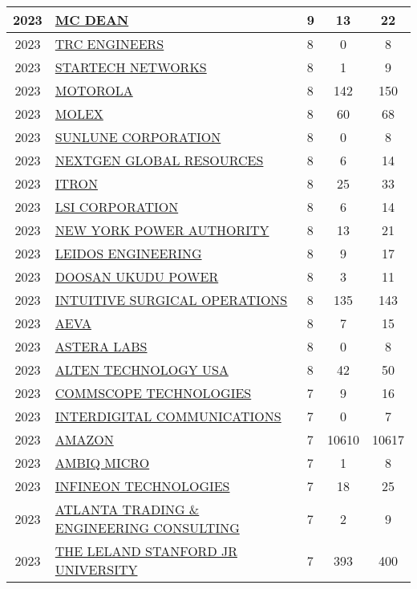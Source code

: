 \documentclass{article}%
\begin{document}
\begin{longtable}{c|p{20em}|p{5em}|c|c}
\hline%
2023&\hyperref[subsec:MCDEAN]{MC DEAN}&9&13&22\\%
\hline%
2023&\hyperref[subsec:TRCENGINEERS]{TRC ENGINEERS}&8&0&8\\%
\hline%
2023&\hyperref[subsec:STARTECHNETWORKS]{STARTECH NETWORKS}&8&1&9\\%
\hline%
2023&\hyperref[subsec:MOTOROLA]{MOTOROLA}&8&142&150\\%
\hline%
2023&\hyperref[subsec:MOLEX]{MOLEX}&8&60&68\\%
\hline%
2023&\hyperref[subsec:SUNLUNECORPORATION]{SUNLUNE CORPORATION}&8&0&8\\%
\hline%
2023&\hyperref[subsec:NEXTGENGLOBALRESOURCES]{NEXTGEN GLOBAL RESOURCES}&8&6&14\\%
\hline%
2023&\hyperref[subsec:ITRON]{ITRON}&8&25&33\\%
\hline%
2023&\hyperref[subsec:LSICORPORATION]{LSI CORPORATION}&8&6&14\\%
\hline%
2023&\hyperref[subsec:NEWYORKPOWERAUTHORITY]{NEW YORK POWER AUTHORITY}&8&13&21\\%
\hline%
2023&\hyperref[subsec:LEIDOSENGINEERING]{LEIDOS ENGINEERING}&8&9&17\\%
\hline%
2023&\hyperref[subsec:DOOSANUKUDUPOWER]{DOOSAN UKUDU POWER}&8&3&11\\%
\hline%
2023&\hyperref[subsec:INTUITIVESURGICALOPERATIONS]{INTUITIVE SURGICAL OPERATIONS}&8&135&143\\%
\hline%
2023&\hyperref[subsec:AEVA]{AEVA}&8&7&15\\%
\hline%
2023&\hyperref[subsec:ASTERALABS]{ASTERA LABS}&8&0&8\\%
\hline%
2023&\hyperref[subsec:ALTENTECHNOLOGYUSA]{ALTEN TECHNOLOGY USA}&8&42&50\\%
\hline%
2023&\hyperref[subsec:COMMSCOPETECHNOLOGIES]{COMMSCOPE TECHNOLOGIES}&7&9&16\\%
\hline%
2023&\hyperref[subsec:INTERDIGITALCOMMUNICATIONS]{INTERDIGITAL COMMUNICATIONS}&7&0&7\\%
\hline%
2023&\hyperref[subsec:AMAZON]{AMAZON}&7&10610&10617\\%
\hline%
2023&\hyperref[subsec:AMBIQMICRO]{AMBIQ MICRO}&7&1&8\\%
\hline%
2023&\hyperref[subsec:INFINEONTECHNOLOGIES]{INFINEON TECHNOLOGIES}&7&18&25\\%
\hline%
2023&\hyperref[subsec:ATLANTATRADINGENGINEERINGCONSULTING]{ATLANTA TRADING \& ENGINEERING CONSULTING}&7&2&9\\%
\hline%
2023&\hyperref[subsec:THELELANDSTANFORDJRUNIVERSITY]{THE LELAND STANFORD JR UNIVERSITY}&7&393&400\\%

\end{longtable}
\end{document}
